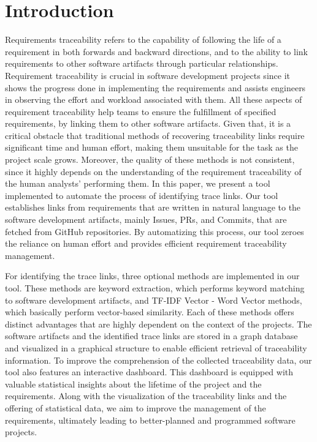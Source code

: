 \documentclass[conference]{IEEEtran}
\begin{document}
\section{Introduction} \label{section:introduction}
Requirements traceability refers to the capability of following the life of a requirement in both forwards and backward directions\cite{gotel-1994}, and to the ability to link requirements to other software artifacts through particular relationships. Requirement traceability is crucial in software development projects since it shows the progress done in implementing the requirements and assists engineers in observing the effort and workload associated with them. All these aspects of requirement traceability help teams to ensure the fulfillment of specified requirements, by linking them to other software artifacts. Given that, it is a critical obstacle that traditional methods of recovering traceability links require significant time and human effort, making them unsuitable for the task as the project scale grows. Moreover, the quality of these methods is not consistent, since it highly depends on the understanding of the requirement traceability of the human analysts' performing them. 
In this paper, we present a tool implemented to automate the process of identifying trace links. Our tool establishes links from requirements that are written in natural language to the software development artifacts, mainly Issues, PRs, and Commits, that are fetched from GitHub repositories. By automatizing this process, our tool zeroes the reliance on human effort and provides efficient requirement traceability management.

For identifying the trace links, three optional methods are implemented in our tool. These methods are keyword extraction, which performs keyword matching to software development artifacts, and TF-IDF Vector - Word Vector methods, which basically perform vector-based similarity. Each of these methods offers distinct advantages that are highly dependent on the context of the projects.
The software artifacts and the identified trace links are stored in a graph database and visualized in a graphical structure to enable efficient retrieval of traceability information. To improve the comprehension of the collected traceability data, our tool also features an interactive dashboard. This dashboard is equipped with valuable statistical insights about the lifetime of the project and the requirements. Along with the visualization of the traceability links and the offering of statistical data, we aim to improve the management of the requirements, ultimately leading to better-planned and programmed software projects.
\end{document}
